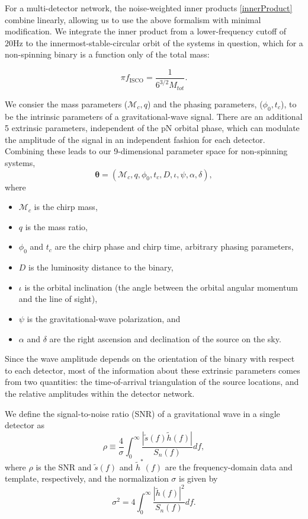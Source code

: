 \documentclass[11pt,a4paper]{emulateapj} 
\newcommand{\thpara}{\boldsymbol{\theta}}
\newcommand{\chmass}{\mathcal{M}_c}
\begin{document}
For a multi-detector network, the noise-weighted inner products
\eqref{innerProduct} combine linearly, allowing us to use the above
formalism with minimal modification.  We integrate the inner product
from a lower-frequency cutoff of $20\text{Hz}$ to the
innermost-stable-circular orbit of the systems in question, which for
a non-spinning binary is a function only of the total mass:

\begin{equation}
  \pi f_{\text{ISCO}} = \frac{1}{6^{3/2}M_{tot}}.
  \label{ISCOFrequency}
\end{equation}
   
We consier the mass parameters ($\chmass,q$) and the phasing
parameters, ($\phi_0,t_c$), to be the intrinsic parameters of a
gravitational-wave signal.  There are an additional 5 extrinsic
parameters, independent of the pN orbital phase, which can modulate
the amplitude of the signal in an independent fashion for each
detector.  Combining these leads to our 9-dimensional parameter space
for non-spinning systems,
\begin{equation}
\thpara = (\chmass, q, \phi_0,t_c,D,\iota,\psi,\alpha,\delta),
\label{parameterspace}
\end{equation}
where

\begin{itemize}
\item $\chmass$ is the chirp mass,
\item $q$ is the mass ratio,
\item $\phi_0$ and $t_c$ are the chirp phase and chirp time, arbitrary
  phasing parameters,
\item $D$ is the luminosity distance to the binary,
\item $\iota$ is the orbital inclination (the angle between the
  orbital angular momentum and the line of sight),
\item $\psi$ is the gravitational-wave polarization, and
\item $\alpha$ and $\delta$ are the right ascension and declination of
  the source on the sky.
\end{itemize}
  Since the wave amplitude depends on the orientation of the binary
  with respect to each detector, most of the information about these
  extrinsic parameters comes from two quantities: the time-of-arrival
  triangulation of the source locations, and the relative amplitudes
  within the detector network.

We define the signal-to-noise ratio (SNR) of a gravitational wave in a
single detector as
\begin{equation}
  \rho \equiv \frac{4}{\sigma} \int^{\infty}_{0}\frac{|
    \tilde{s}(f)\tilde{h}(f)|}{S_{n}(f)}df,
  \label{formalSNR}
\end{equation}
where $\rho$ is the SNR and $\tilde s(f)$ and $\tilde{h}^{*}(f)$ are
the frequency-domain data and template, respectively, and the
normalization $\sigma$ is given by
\begin{equation}
  \sigma^2 = 4\int^{\infty}_{0}\frac{| \tilde{h}(f)|^2}{S_n(f)}df.
  \label{SNRnorm}
\end{equation}
\end{document}
